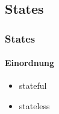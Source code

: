 \subsection{States}
\begin{frame}
  \frametitle{States}
  \framesubtitle{Einordnung}
  \begin{itemize}
    \item stateful
    \item stateless
  \end{itemize}
\end{frame}
